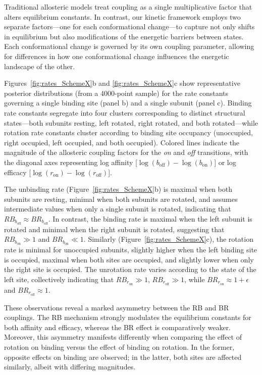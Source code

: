 \documentclass[pdflatex,sn-nature]{sn-jnl}%
\begin{document}
Traditional allosteric models treat coupling as a single multiplicative factor that alters equilibrium constants. In contrast, our kinetic framework employs two separate factors—one for each conformational change—to capture not only shifts in equilibrium but also modifications of the energetic barriers between states. Each conformational change is governed by its own coupling parameter, allowing for differences in how one conformational change influences the energetic landscape of the other.

Figures~\ref{fig:rates_SchemeX}b and \ref{fig:rates_SchemeX}c show representative posterior distributions (from a 4000-point sample) for the rate constants governing a single binding site (panel b) and a single subunit (panel c). Binding rate constants segregate into four clusters corresponding to distinct structural states---both subunits resting, left rotated, right rotated, and both rotated---while rotation rate constants cluster according to binding site occupancy (unoccupied, right occupied, left occupied, and both occupied). Colored lines indicate the magnitude of the allosteric coupling factors for the \textit{on} and \textit{off} transitions, with the diagonal axes representing log affinity [$\log(b_{\text{off}})-\log(b_{\text{on}})$] or log efficacy [$\log(r_{\text{on}})-\log(r_{\text{off}})$].

The unbinding rate (Figure~\ref{fig:rates_SchemeX}b) is maximal when both subunits are resting, minimal when both subunits are rotated, and assumes intermediate values when only a single subunit is rotated, indicating that $RB_{b_{\text{off}}}\approx BR_{b_{\text{off}}}$. In contrast, the binding rate is maximal when the left subunit is rotated and minimal when the right subunit is rotated, suggesting that $RB_{b_{\text{on}}}\gg1$ and $BR_{b_{\text{on}}}\ll1$. Similarly (Figure~\ref{fig:rates_SchemeX}c), the rotation rate is minimal for unoccupied subunits, slightly higher when the left binding site is occupied, maximal when both sites are occupied, and slightly lower when only the right site is occupied. The unrotation rate varies according to the state of the left site, collectively indicating that $RB_{r_{\text{on}}}\gg1$, $RB_{r_{\text{off}}}\gg1$, while $BR_{r_{\text{on}}}\approx 1+\epsilon$ and $BR_{r_{\text{off}}}\approx 1$. 

These observations reveal a marked asymmetry between the RB and BR couplings. The RB mechanism strongly modulates the equilibrium constants for both affinity and efficacy, whereas the BR effect is comparatively weaker. Moreover, this asymmetry manifests differently when comparing the effect of rotation on binding versus the effect of binding on rotation. In the former, opposite effects on binding are observed; in the latter, both sites are affected similarly, albeit with differing magnitudes.
\end{document}

